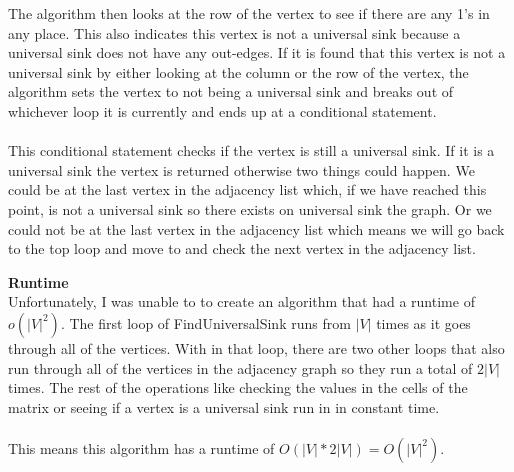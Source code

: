 \documentclass[12pt]{article}
\begin{document}
\begin{enumerate}
	The algorithm then looks at the row of the vertex to see if there are any 1's in any place.  This also indicates this vertex is not a universal sink because a universal sink does not have any out-edges.
	If it is found that this vertex is not a universal sink by either looking at the column or the row of the vertex, the algorithm sets the vertex to not being a universal sink and breaks out of whichever loop it is currently and 
	ends up at a conditional statement.\\
	\\
	This conditional statement checks if the vertex is still a universal sink.  If it is a universal sink the vertex is returned otherwise two things could happen.  
	We could be at the last vertex in the adjacency list which, if we have reached this point, is not a universal sink so there exists on universal sink the graph.
	Or we could not be at the last vertex in the adjacency list which means we will go back to the top loop and move to and check the next vertex in the adjacency list.
	
	\textbf{Runtime}\\
	Unfortunately, I was unable to to create an algorithm that had a runtime of $o(|V|^2)$.
	The first loop of FindUniversalSink runs from $|V|$ times as it goes through all of the vertices.  
	With in that loop, there are two other loops that also run through all of the vertices in the adjacency graph so they run a total of $2|V|$ times.
	The rest of the operations like checking the values in the cells of the matrix or seeing if a vertex is a universal sink run in in constant time.\\
	\\
	This means this algorithm has a runtime of $O(|V|*2|V|) = O(|V|^2)$.  
	

\end{enumerate}
\end{document}
